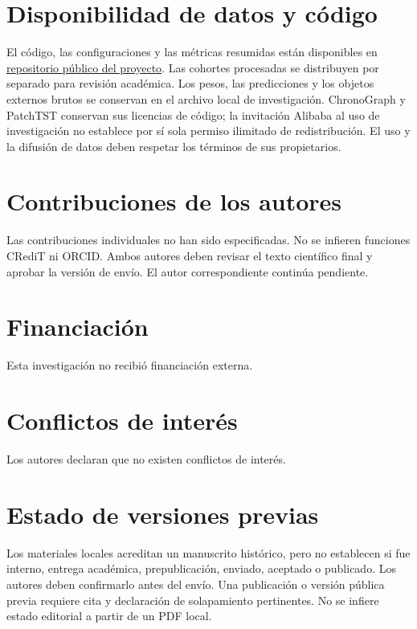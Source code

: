 \section*{Disponibilidad de datos y código}
El código, las configuraciones y las métricas resumidas están disponibles en \href{https://github.com/Nunclear/prediccion-proactiva-de-recursos-computacionales-para-microservicios}{repositorio público del proyecto}. Las cohortes procesadas se distribuyen por separado para revisión académica. Los pesos, las predicciones y los objetos externos brutos se conservan en el archivo local de investigación. ChronoGraph y PatchTST conservan sus licencias de código; la invitación Alibaba al uso de investigación no establece por sí sola permiso ilimitado de redistribución. El uso y la difusión de datos deben respetar los términos de sus propietarios.
\section*{Contribuciones de los autores}
Las contribuciones individuales no han sido especificadas. No se infieren funciones CRediT ni ORCID. Ambos autores deben revisar el texto científico final y aprobar la versión de envío. El autor correspondiente continúa pendiente.
\section*{Financiación}
Esta investigación no recibió financiación externa.
\section*{Conflictos de interés}
Los autores declaran que no existen conflictos de interés.
\section*{Estado de versiones previas}
Los materiales locales acreditan un manuscrito histórico, pero no establecen si fue interno, entrega académica, prepublicación, enviado, aceptado o publicado. Los autores deben confirmarlo antes del envío. Una publicación o versión pública previa requiere cita y declaración de solapamiento pertinentes. No se infiere estado editorial a partir de un PDF local.
